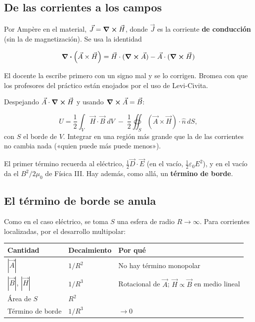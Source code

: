 \documentclass[12pt,a4paper]{article}
\begin{document}
\subsection{De las corrientes a los campos}

Por Ampère en el material, $\vec J = \curl\vec H$, donde $\vec J$ es la
corriente \textbf{de conducción} (sin la de magnetización). Se usa la identidad

\[
\div(\vec A\times\vec H) = \vec H\cdot(\curl\vec A) - \vec A\cdot(\curl\vec H)
\]

\begin{notebox}
El docente la escribe primero con un signo mal y se lo corrigen. Bromea con
que los profesores del práctico están enojados por el uso de Levi-Civita.
\end{notebox}

Despejando $\vec A\cdot\curl\vec H$ y usando $\curl\vec A = \vec B$:

\[
U = \frac12\int_V \vec H\cdot\vec B\;dV
\;-\; \frac12\oiint_S (\vec A\times\vec H)\cdot\hat n\,dS,
\]
con $S$ el borde de $V$. Integrar en una región más grande que la de las
corrientes no cambia nada («quien puede más puede menos»).

El primer término recuerda al eléctrico, $\tfrac12\vec D\cdot\vec E$ (en el
vacío, $\tfrac12\varepsilon_0E^2$), y en el vacío da el $B^2/2\mu_0$ de Física
III. Hay además, como allá, un \textbf{término de borde}.

\subsection{El término de borde se anula}

Como en el caso eléctrico, se toma $S$ una esfera de radio $R\to\infty$. Para
corrientes localizadas, por el desarrollo multipolar:

\begin{center}
\renewcommand{\arraystretch}{1.35}
\small
\begin{tabularx}{\textwidth}{l>{\raggedright\arraybackslash}X>{\raggedright\arraybackslash}X}
\toprule
\textbf{Cantidad} & \textbf{Decaimiento} & \textbf{Por qué} \\
\midrule
$|\vec A|$ & $1/R^2$ & No hay término monopolar \\
$|\vec B|$, $|\vec H|$ & $1/R^3$ & Rotacional de $\vec A$; $\vec H\propto\vec B$ en medio lineal \\
Área de $S$ & $R^2$ &  \\
Término de borde & $1/R^3$ & $\to 0$ \\
\bottomrule
\end{tabularx}
\end{center}
\end{document}
